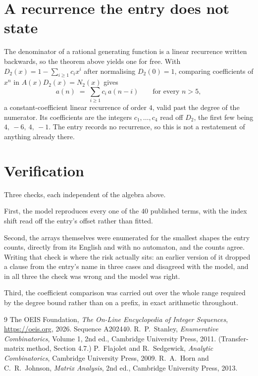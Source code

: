 \documentclass[11pt,a4paper]{article}
\theoremstyle{plain}
\theoremstyle{definition}
\begin{document}
\section{A recurrence the entry does not state}

The denominator of a rational generating function is a linear recurrence written backwards, so
the theorem above yields one for free. With $D_2(x)=1-\sum_{i\ge1}c_ix^i$ after normalising
$D_2(0)=1$, comparing coefficients of $x^n$ in $A(x)D_2(x)=N_2(x)$ gives
\[
a(n)\;=\;\sum_{i\ge1}c_i\,a(n-i)\qquad\text{for every }n>5,
\]
a constant-coefficient linear recurrence of order $4$, valid past the degree of the
numerator. Its coefficients are the integers $c_1,\dots,c_{4}$ read off $D_2$, the first few being $4,\ -6,\ 4,\ -1$. The entry records no recurrence, so this is not a restatement of anything
already there.

\section{Verification}

Three checks, each independent of the algebra above.

First, the model reproduces every one of the $40$ published terms, with the index shift
read off the entry's offset rather than fitted.

Second, the arrays themselves were enumerated for the smallest shapes the entry counts,
directly from its English and with no automaton, and the counts agree. Writing that check is
where the risk actually sits: an earlier version of it dropped a clause from the entry's name
in three cases and disagreed with the model, and in all three the check was wrong and the model
was right.

Third, the coefficient comparison was carried out over the whole range required by the degree
bound rather than on a prefix, in exact arithmetic throughout.

\begin{thebibliography}{9}
 The OEIS Foundation, \emph{The On-Line Encyclopedia of Integer
Sequences}, \url{https://oeis.org}, 2026. Sequence A202440.
 R.~P.~Stanley, \emph{Enumerative Combinatorics}, Volume 1, 2nd ed.,
Cambridge University Press, 2011. (Transfer-matrix method, Section 4.7.)
 P.~Flajolet and R.~Sedgewick, \emph{Analytic Combinatorics}, Cambridge
University Press, 2009.
 R.~A.~Horn and C.~R.~Johnson, \emph{Matrix Analysis}, 2nd ed., Cambridge
University Press, 2013.
\end{thebibliography}
\end{document}
